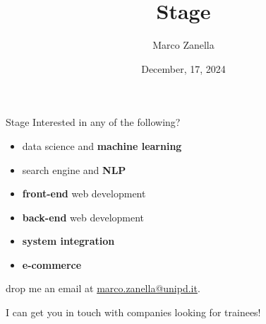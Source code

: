 \documentclass[11pt]{beamer}
\author{Marco Zanella}
\title{Stage}
\institute{University of Padova}
\date{December, 17, 2024}
\renewcommand{\emph}[1]{\textbf{#1}}
\begin{document}
	\begin{frame}{Stage}
		Interested in any of the following?
		\begin{itemize}
			\item data science and \emph{machine learning}
			\item search engine and \emph{NLP}
			\item \emph{front-end} web development
			\item \emph{back-end} web development
			\item \emph{system integration}
			\item \emph{e-commerce}
		\end{itemize}
		drop me an email at \href{mailto:marco.zanella@unipd.it}{marco.zanella@unipd.it}.
		
		I can get you in touch with companies looking for trainees!
	\end{frame}
\end{document}
